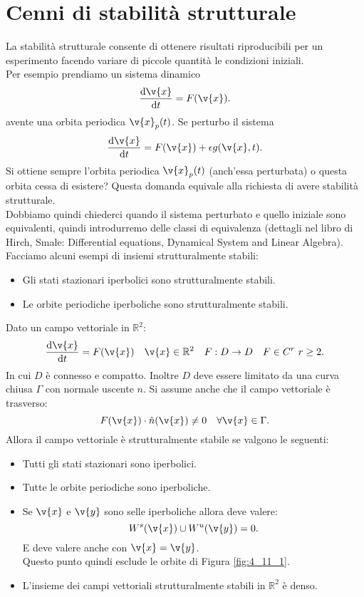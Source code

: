 \section{Cenni di stabilità strutturale}%
La stabilità strutturale consente di ottenere risultati riproducibili per un esperimento facendo variare di piccole quantità le condizioni iniziali.\\
Per esempio prendiamo un sistema dinamico 
\[
    \frac{\text{d} \v{x}}{\text{d} t} = F(\v{x}) 
.\] avente una orbita periodica $\v{x}_p(t) $. Se perturbo il sistema 
\[
    \frac{\text{d} \v{x}}{\text{d} t} = F(\v{x}) + \epsilon g(\v{x}, t) 
.\] 
Si ottiene sempre l'orbita periodica $\v{x}_p(t)$ (anch'essa perturbata) o questa orbita cessa di esistere? Questa domanda equivale alla richiesta di avere stabilità strutturale. \\
Dobbiamo quindi chiederci quando il sistema perturbato e quello iniziale sono equivalenti, quindi introdurremo delle classi di equivalenza (dettagli nel libro di Hirch, Smale: Differential equations, Dynamical System and Linear Algebra). \\
Facciamo alcuni esempi di insiemi strutturalmente stabili:
\begin{itemize}
    \item Gli stati stazionari iperbolici sono strutturalmente stabili.
    \item Le orbite periodiche iperboliche sono strutturalmente stabili.
\end{itemize}
\begin{thm}[Peixoto]
    Dato un campo vettoriale in $\mathbb{R}^2$:
    \[
	\frac{\text{d} \v{x}}{\text{d} t} = F(\v{x}) \quad  \v{x}\in \mathbb{R}^2 \quad  F:D\to D \quad  F \in C^r \ r \ge 2
    .\] 
    In cui $D$ è connesso e compatto. Inoltre $D$ deve essere limitato da una curva chiusa $\Gamma$ con normale uscente $n$. Si assume anche che il campo vettoriale è trasverso:
    \[
	F(\v{x}) \cdot \hat{n}(\v{x}) \neq 0 \quad  \forall \v{x}\in \Gamma
    .\] 
    Allora il campo vettoriale è strutturalmente stabile se valgono le seguenti:
    \begin{itemize}
        \item Tutti gli stati stazionari sono iperbolici.
	\item Tutte le orbite periodiche sono iperboliche.
	\item Se $\v{x}$ e $\v{y}$ sono selle iperboliche allora deve valere:
	    \[
		W^s(\v{x}) \cup W^u(\v{y}) = 0
	    .\] 
	    E deve valere anche con $\v{x}= \v{y}$. \\
	    Questo punto quindi esclude le orbite di Figura \ref{fig:4_11_1}.
	\item L'insieme dei campi vettoriali strutturalmente stabili in $\mathbb{R}^2$ è denso.
    \end{itemize}
\end{thm}
\noindent
